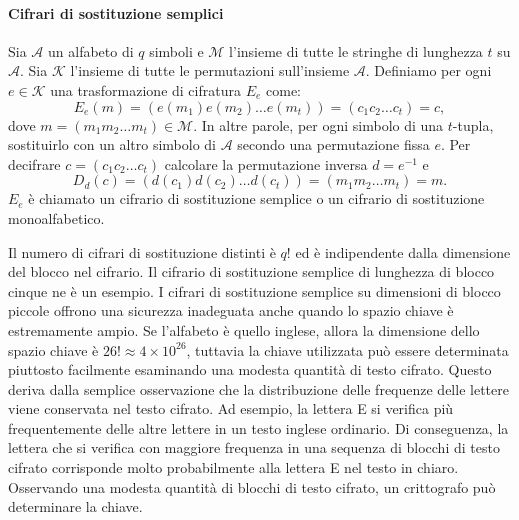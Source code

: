 \documentclass{article}
\theoremstyle{definition}
\begin{document}
\paragraph{Cifrari di sostituzione semplici}  Sia $\mathcal{A}$ un alfabeto di \( q \) simboli e $\mathcal{M}$ l'insieme di tutte le stringhe di lunghezza \( t \) su $\mathcal{A}$. Sia $\mathcal{K}$ l'insieme di tutte le permutazioni sull'insieme $\mathcal{A}$. Definiamo per ogni \( e \in \mathcal{K} \) una trasformazione di cifratura \( E_e \) come:
\[
E_e(m)=(e(m_1)e(m_2) \ldots e(m_t)) = (c_1c_2 \ldots c_t) = c,
\]
dove \( m = (m_1m_2 \ldots m_t) \in \mathcal{M} \). In altre parole, per ogni simbolo di una \( t \)-tupla, sostituirlo con un altro simbolo di $\mathcal{A}$ secondo una permutazione fissa \( e \). Per decifrare \( c = (c_1c_2 \ldots c_t) \) calcolare la permutazione inversa \( d = e^{-1} \) e
\[
D_d(c)=(d(c_1)d(c_2) \ldots d(c_t)) = (m_1m_2 \ldots m_t) = m.
\]
\( E_e \) è chiamato un cifrario di sostituzione semplice o un cifrario di sostituzione monoalfabetico.

Il numero di cifrari di sostituzione distinti è $q!$ ed è indipendente dalla dimensione del blocco nel cifrario. Il cifrario di sostituzione semplice di lunghezza di blocco cinque ne è un esempio. I cifrari di sostituzione semplice su dimensioni di blocco piccole offrono una sicurezza inadeguata anche quando lo spazio chiave è estremamente ampio. Se l'alfabeto è quello inglese, allora la dimensione dello spazio chiave è $26! \approx 4 \times 10^{26}$, tuttavia la chiave utilizzata può essere determinata piuttosto facilmente esaminando una modesta quantità di testo cifrato. Questo deriva dalla semplice osservazione che la distribuzione delle frequenze delle lettere viene conservata nel testo cifrato. Ad esempio, la lettera E si verifica più frequentemente delle altre lettere in un testo inglese ordinario. Di conseguenza, la lettera che si verifica con maggiore frequenza in una sequenza di blocchi di testo cifrato corrisponde molto probabilmente alla lettera E nel testo in chiaro. Osservando una modesta quantità di blocchi di testo cifrato, un crittografo può determinare la chiave.



\end{document}
